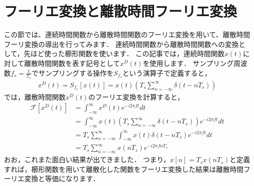 \section{フーリエ変換と離散時間フーリエ変換}

この節では、連続時間関数から離散時間関数のフーリエ変換を用いて、離散時間フーリ変換の導出を行ってみます．
連続時間関数から離散時間関数への変換として，先ほど使った櫛形関数を使います．
この記事では，連続時間関数$x(t)$に対して離散時間関数を表す記号として$x^D(t)$を使用します．
サンプリング周波数$f_s=\frac{1}{T_s}$でサンプリングする操作を$S_{f_s}$という演算子で定義すると，
\begin{align}
x^D(t) = S_{f_s}[x(t)] = x(t) \left(T_s \sum_{n=-\infty}^{\infty} \delta\left(t- nT_s\right) \right)
\end{align}
では，離散時間関数$x^D(t)$のフーリエ変換を計算すると，
\begin{align}
\mathcal{F}[x^D(t)] &= \int_{-\infty}^{\infty} x^D(t) e^{-i2\pi ft} dt\nonumber\\
    &= \int_{-\infty}^{\infty} x(t) \left(T_s \sum_{n=-\infty}^{\infty} \delta\left(t- nT_s\right) \right) e^{-i2\pi ft} dt \nonumber\\
    &= T_s \sum_{n=-\infty}^{\infty} \int_{-\infty}^{\infty} x(t) \delta\left(t- nT_s\right) e^{-i2\pi ft} dt \nonumber\\
    &= T_s \sum_{n=-\infty}^{\infty} x\left(nT_s\right) e^{-i2\pi fnT_s}
\end{align}
おお，これまた面白い結果が出てきました．
つまり，$x[n]=T_s x(nT_s)$と定義すれば，櫛形関数を用いて離散化した関数をフーリエ変換した結果は離散時間フーリエ変換と等価になります．

